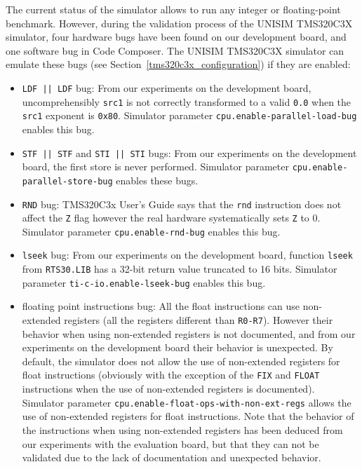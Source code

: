 The current status of the simulator allows to run any integer or floating-point benchmark.
However, during the validation process of the UNISIM TMS320C3X simulator, four hardware bugs have been found on our development board, and one software bug in Code Composer.
The UNISIM TMS320C3X simulator can emulate these bugs (see Section~\ref{tms320c3x_configuration}) if they are enabled:
\begin{itemize}
\item \texttt{LDF || LDF} bug: From our experiments on the development board, uncomprehensibly \texttt{src1} is not correctly transformed to a valid \texttt{0.0} when the \texttt{src1} exponent is \texttt{0x80}. Simulator parameter \texttt{cpu.enable-parallel-load-bug} enables this bug.
\item \texttt{STF || STF} and \texttt{STI || STI} bugs: From our experiments on the development board, the first store is never performed. Simulator parameter \texttt{cpu.enable-parallel-store-bug} enables these bugs.
\item \texttt{RND} bug: TMS320C3x User’s Guide says that the \texttt{rnd} instruction does not affect the \texttt{Z} flag however the real hardware systematically sets \texttt{Z} to 0. Simulator parameter \texttt{cpu.enable-rnd-bug} enables this bug.
\item \texttt{lseek} bug: From our experiments on the development board, function \texttt{lseek} from \texttt{RTS30.LIB} has a 32-bit return value truncated to 16 bits. Simulator parameter \texttt{ti-c-io.enable-lseek-bug} enables this bug.
\item floating point instructions bug: All the float instructions can use non-extended registers (all the registers different than \texttt{R0-R7}). However their behavior when using non-extended registers is not documented, and from our experiments on the development board their behavior is unexpected. By default, the simulator does not allow the use of non-extended registers for float instructions (obviously with the exception of the \texttt{FIX} and \texttt{FLOAT} instructions when the use of non-extended registers is documented). Simulator parameter \texttt{cpu.enable-float-ops-with-non-ext-regs} allows the use of non-extended registers for float instructions. Note that the behavior of the instructions when using non-extended registers has been deduced from our experiments with the evaluation board, but that they can not be validated due to the lack of documentation and unexpected behavior.
\end{itemize}

